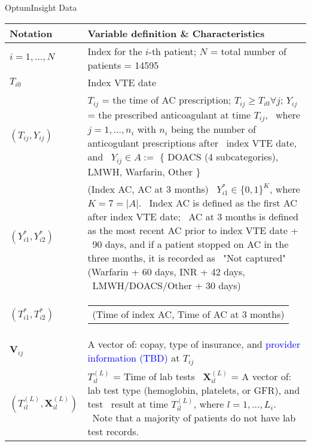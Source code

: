 \documentclass[11pt]{article}
\makeatletter
\newcommand{\specialcell}[2][c]{%
  \begin{tabular}[#1]{@{}l@{}}#2\end{tabular}}
\makeatother
\begin{document}
{\LARGE OptumInsight Data}

\begin{center}
\begin{longtable}{| p{2.5cm} | p{14cm} |} 
    \hline
    Notation & Variable definition \& Characteristics \\  
    \hline
    $i = 1, \ldots, N$ & \specialcell{ Index for the $i$-th patient; \\ $N$ = total number of patients = 14595 } \\
    \hline
    $T_{i0}$ & Index VTE date\\
    \hline
    $(T_{ij}, Y_{ij})$ & \specialcell{$T_{ij}$ = the time of AC prescription; $T_{ij} \geq T_{i0} \forall j$; \\ $Y_{ij}$ = the prescribed anticoagulant at time $T_{ij}$, \\ \ where $j = 1, \ldots, n_i$ with $n_i$ being the number of anticogulant prescriptions after \\ \  index VTE date, and \\ \ $Y_{ij} \in A :=$ \{ DOACS (4 subcategories), LMWH, Warfarin, Other \}} \\
    \hline 
    $(Y_{i1}^*, Y_{i2}^*)$ & \specialcell{ (Index AC, AC at 3 months) \\ \ $Y_{i1}^* \in \{0,1\}^K$, where $K = 7 = |A|$. \\ \ Index AC is defined as the first AC after index VTE date; \\ \ AC at 3 months is defined as the most recent AC prior to index VTE date + \\ \ 90 days, and if a patient stopped on AC in the three months, it is recorded as \\ \ "Not captured" (Warfarin + 60 days, INR + 42 days, \\ \ LMWH/DOACS/Other + 30 days)} \\
    \hline
    $(T_{i1}^*, T_{i2}^*)$ & \specialcell{ (Time of index AC, Time of AC at 3 months) } \\
    \hline
    $\bm V_{ij}$ & A vector of: copay, type of insurance, and \textcolor{blue}{ provider information (TBD)} at $T_{ij}$\\
    \hline 
    $(T_{il}^{(L)}, \bm X_{il}^{(L)})$ & \specialcell{ $T_{il}^{(L)}$ = Time of lab tests \\ \ $\bm X_{il}^{(L)}$ = A vector of: lab test type (hemoglobin, platelets, or GFR), and test \\ \ result at time $T_{il}^{(L)}$, where $l = 1, \ldots, L_i$. \\ \ Note that a majority of patients do not have lab test records.} \\

\end{longtable}
\end{center}
\end{document}
